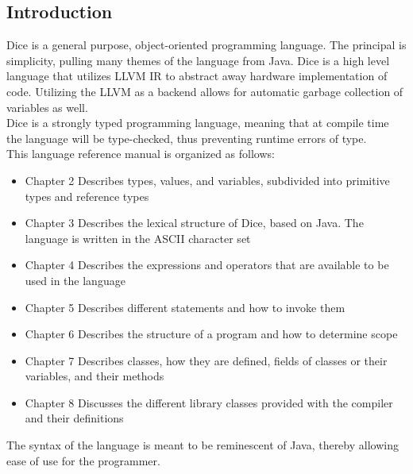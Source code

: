 \begin{homeworkProblem}
	\section{Introduction}
	Dice is a general purpose, object-oriented programming language. The principal is simplicity, pulling many themes of the language from Java. Dice is a high level language that utilizes LLVM IR to abstract away hardware implementation of code. Utilizing the LLVM as a backend allows for automatic garbage collection of variables as well. \\
	Dice is a strongly typed programming language, meaning that at compile time the language will be type-checked, thus preventing runtime errors of type. \\
	This language reference manual is organized as follows:\\
	\begin{itemize}
		\item Chapter 2 Describes types, values, and variables, subdivided into primitive types and reference types
		\item Chapter 3 Describes the lexical structure of Dice, based on Java. The language is written in the ASCII character set
		\item Chapter 4 Describes the expressions and operators that are available to be used in the language
		\item Chapter 5 Describes different statements and how to invoke them
		\item Chapter 6 Describes the structure of a program and how to determine scope
		\item Chapter 7 Describes classes, how they are defined, fields of classes or their variables, and their methods
		\item Chapter 8 Discusses the different library classes provided with the compiler and their definitions
	\end{itemize}
	The syntax of the language is meant to be reminescent of Java, thereby allowing ease of use for the programmer. 
\end{homeworkProblem}
